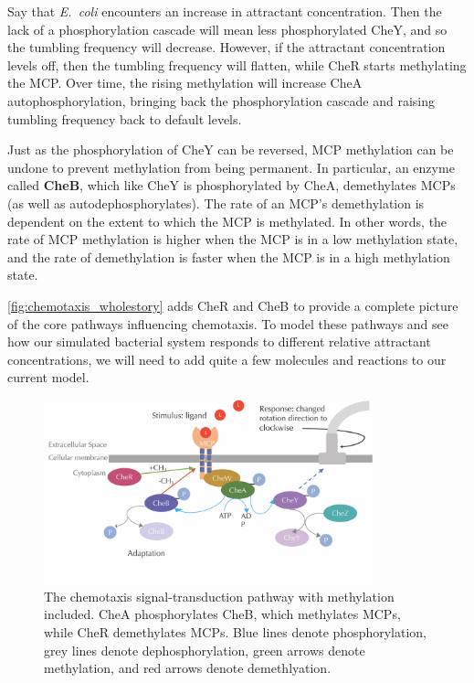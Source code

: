 Say that \textit{E.~coli} encounters an increase in attractant concentration. Then the lack of a phosphorylation cascade will mean less phosphorylated CheY, and so the tumbling frequency will decrease. However, if the attractant concentration levels off, then the tumbling frequency will flatten, while CheR starts methylating the MCP. Over time, the rising methylation will increase CheA autophosphorylation, bringing back the phosphorylation cascade and raising tumbling frequency back to default levels.

Just as the phosphorylation of CheY can be reversed, MCP methylation can be undone to prevent methylation from being permanent. In particular, an enzyme called \textbf{CheB}, which like CheY is phosphorylated by CheA, demethylates MCPs (as well as autodephosphorylates). The rate of an MCP's demethylation is dependent on the extent to which the MCP is methylated. In other words, the rate of MCP methylation is higher when the MCP is in a low methylation state, and the rate of demethylation is faster when the MCP is in a high methylation state.

\autoref{fig:chemotaxis_wholestory} adds CheR and CheB to provide a complete picture of the core pathways influencing chemotaxis. To model these pathways and see how our simulated bacterial system responds to different relative attractant concentrations, we will need to add quite a few molecules and reactions to our current model.\\

\begin{figure}[h]
\centering
\mySfFamily
\includegraphics[width = 0.85\textwidth]{../images_CMYK/chemotaxis_wholestory}
\caption{The chemotaxis signal-transduction pathway with methylation included. CheA phosphorylates CheB, which methylates MCPs, while CheR demethylates MCPs. Blue lines denote phosphorylation, grey lines denote dephosphorylation, green arrows denote methylation, and red arrows denote demethlyation.}
\label{fig:chemotaxis_wholestory}
\end{figure}


